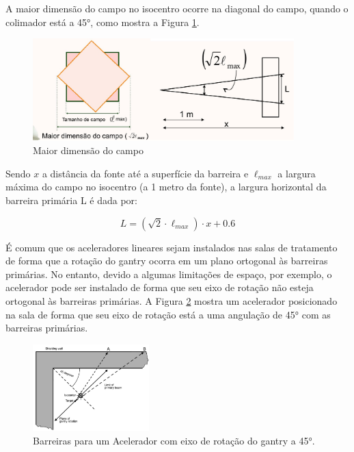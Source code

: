 \documentclass[11pt,a4paper]{article}
\newcounter{exemplo}
\begin{document}
            A maior dimensão do campo no isocentro ocorre na diagonal do campo, quando o colimador está a \ang{45}, como mostra a Figura \ref{fig:maiorDimensaoDoCampo}.

                \begin{figure}[h]
                    \centering
                    \includegraphics[width=0.9\textwidth]{Imagens/maiorDimensaoDoCampo.JPG}
                    \caption{Maior dimensão do campo}
                    \label{fig:maiorDimensaoDoCampo}
                \end{figure}
            
            Sendo $x$ a distância da fonte até a superfície da barreira e $\ell_{max}$ a largura máxima do campo no isocentro (a 1 metro da fonte), a largura horizontal da barreira primária L é dada por:

                \begin{equation}
                    L = \left(\sqrt{2} \cdot \ell_{max}\right) \cdot x + 0.6
                \end{equation}
                
            É comum que os aceleradores lineares sejam instalados nas salas de tratamento de forma que a rotação do gantry ocorra em um plano ortogonal às barreiras primárias.  No entanto, devido a algumas limitações de espaço, por exemplo, o acelerador pode ser instalado de forma que seu eixo de rotação não esteja ortogonal às barreiras primárias. A Figura \ref{fig:esquemaBarreiraAceleradorAngulado} mostra um acelerador posicionado na sala de forma que seu eixo de rotação está a uma angulação de \ang{45} com as barreiras primárias. 
                
                    \begin{figure}[h]
                        \centering
                        \includegraphics[width=0.4\textwidth]{Imagens/esquemaBarreiraAceleradorAngulado.JPG}
                        \caption{Barreiras para um Acelerador com eixo de rotação do gantry a \ang{45}.}
                        \label{fig:esquemaBarreiraAceleradorAngulado}
                    \end{figure}
\end{document}
